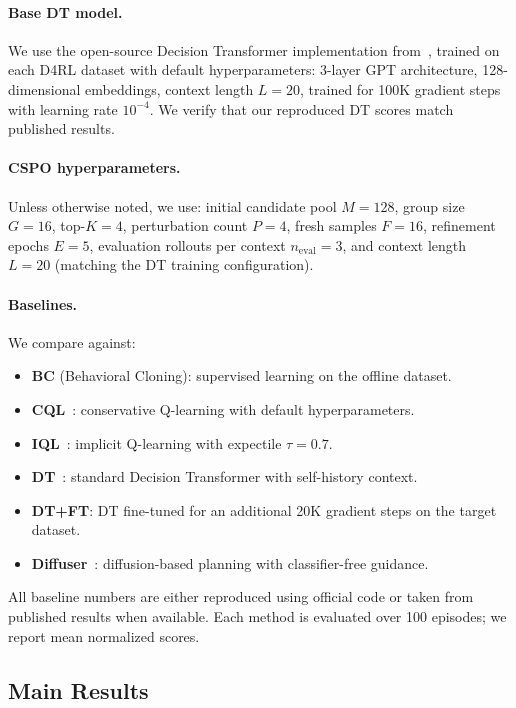 \documentclass{article}
\newcommand{\cspo}{\textsc{CSPO}}
\begin{document}
\paragraph{Base DT model.} We use the open-source Decision Transformer implementation from~\citet{chen2021decision}, trained on each D4RL dataset with default hyperparameters: 3-layer GPT architecture, 128-dimensional embeddings, context length $L = 20$, trained for 100K gradient steps with learning rate $10^{-4}$. We verify that our reproduced DT scores match published results.

\paragraph{\cspo{} hyperparameters.} Unless otherwise noted, we use: initial candidate pool $M = 128$, group size $G = 16$, top-$K = 4$, perturbation count $P = 4$, fresh samples $F = 16$, refinement epochs $E = 5$, evaluation rollouts per context $n_{\text{eval}} = 3$, and context length $L = 20$ (matching the DT training configuration).

\paragraph{Baselines.} We compare against:
\begin{itemize}
    \item \textbf{BC} (Behavioral Cloning): supervised learning on the offline dataset.
    \item \textbf{CQL}~\citep{kumar2020conservative}: conservative Q-learning with default hyperparameters.
    \item \textbf{IQL}~\citep{kostrikov2022offline}: implicit Q-learning with expectile $\tau = 0.7$.
    \item \textbf{DT}~\citep{chen2021decision}: standard Decision Transformer with self-history context.
    \item \textbf{DT+FT}: DT fine-tuned for an additional 20K gradient steps on the target dataset.
    \item \textbf{Diffuser}~\citep{janner2022planning}: diffusion-based planning with classifier-free guidance.
\end{itemize}
All baseline numbers are either reproduced using official code or taken from published results when available. Each method is evaluated over 100 episodes; we report mean normalized scores.

\subsection{Main Results}
\label{sec:main_results}
\end{document}
